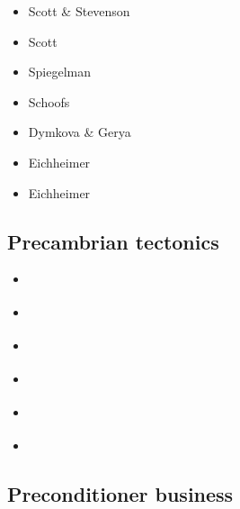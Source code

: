 \begin{scriptsize}
\begin{itemize}
\item[\nineteeneightysix] Scott \& Stevenson \cite{scst86}
\item[\nineteeneightyeight] Scott \cite{scot88}
\item[\nineteenninetythree] Spiegelman \cite{spie93}
\item[\twothousand] Schoofs \etal \cite{scth00b}
\item[\twothousandthirteen] Dymkova \& Gerya \cite{dyge13}
\item[\twothousandnineteen] Eichheimer \etal \cite{eitp19}
\item[\twothousandtwenty] Eichheimer \etal \cite{eitf20}
\end{itemize}
\end{scriptsize}

\subsection{Precambrian tectonics}

\begin{scriptsize}
\begin{itemize}
\item[\nineteenninetyfour] \cite{guto94}
\item[\twothousandthree] \cite{wemv03}
\item[\twothousandten] \cite{sigb10}
\item[\twothousandeleven] \cite{pege11}
\item[\twothousandfourteen] \cite{gery14}\cite{gagb14}\cite{sigb14}
\item[\twothousandtwenty] \cite{poyd20}
\end{itemize}
\end{scriptsize}

\subsection{Preconditioner business}

